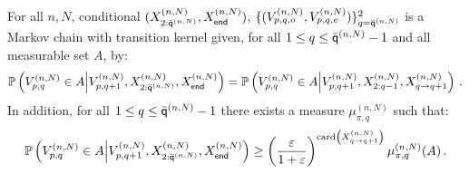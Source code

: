 \begin{lemma}
For all $n,N$, conditional  $(X_{2:\bar{\mathsf{q}}^{(n,N)}}^{(n,N)},X_{\mathsf{end}}^{(n,N)})$, $\{(V_{p,q,o}^{(n,N)},V_{p,q,e}^{(n,N)})\}_{q=\bar{\mathsf{q}}^{(n,N)}}^2$ is a Markov chain with transition kernel given, for all $1\le q \le \bar{\mathsf{q}}^{(n,N)}-1$ and all measurable set $A$, by:
\[
\mathbb{P}\left(V^{(n,N)}_{p,q}\in A\middle|V^{(n,N)}_{p,q+1},X_{2:\bar{\mathsf{q}}^{(n,N)}}^{(n,N)},X_{\mathsf{end}}^{(n,N)}\right) = \mathbb{P}\left(V^{(n,N)}_{p,q}\in A\middle|V^{(n,N)}_{p,q+1},X^{(n,N)}_{2:q-1},X^{(n,N)}_{q\to q+1}\right)\,.
\]
In addition,  for all $1\le q \le \bar{\mathsf{q}}^{(n,N)}-1$ there exists a measure $\mu^{(n,N)}_{\pi,q}$ such that:
\[
\mathbb{P}\left(V^{(n,N)}_{p,q}\in A\middle|V^{(n,N)}_{p,q+1},X_{2:\bar{\mathsf{q}}^{(n,N)}}^{(n,N)},X_{\mathsf{end}}^{(n,N)}\right)\ge \left(\frac{\varepsilon}{1+\varepsilon}\right)^{\mathrm{card}\left(X^{(n,N)}_{q\to q+1}\right)} \mu^{(n,N)}_{\pi,q}(A)\,.
\] 
\end{lemma}

